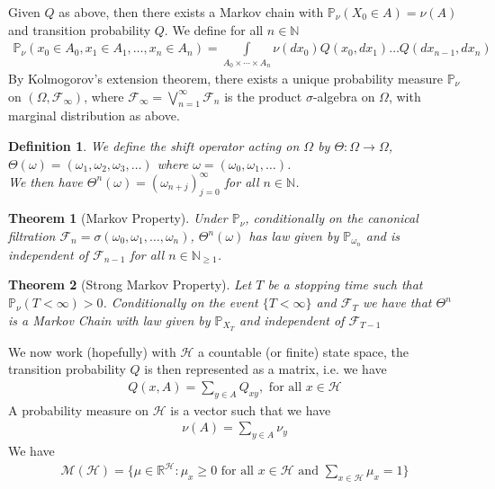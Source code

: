\documentclass[11pt,a4paper, final]{article}
\newtheorem{thm}{Theorem}[section]
\newtheorem{defn}{Definition}[section]
\theoremstyle{definition}
\begin{document}
\noindent Given $Q$ as above, then there exists a Markov chain with $\mathbb{P}_\nu ( X_0 \in A) = \nu (A)$ and transition probability $Q$. We define for all $n  \in \mathbb{N}$ 
\begin{align*}
\mathbb{P}_\nu ( x_0 \in A_0 , x_1 \in A_1, \dots , x_n \in A_n ) = \int \limits_{A_0 \times \cdots \times A_n} \nu (dx_0) Q(x_0,dx_1) \dots Q(dx_{n-1}, dx_n)
\end{align*}
By Kolmogorov's extension theorem, there exists a unique probability measure $\mathbb{P}_\nu$ on $( \Omega, \mathcal{F}_\infty)$, where $\mathcal{F}_\infty = \bigvee_{n=1}^\infty \mathcal{F}_n$ is the product $\sigma$-algebra on $\Omega$, with marginal distribution as above. 
\begin{defn} We define the shift operator acting on $\Omega$ by $\Theta :\Omega \to \Omega$, $\Theta(\omega)=( \omega_1, \omega_2, \omega_3, \dots )$ where $\omega=( \omega_0, \omega_1, \dots )$. \\ We then have $\Theta^n( \omega) = ( \omega_{n+j})_{j=0}^\infty$ for all $n \in \mathbb{N}$.
\end{defn}
\begin{thm}[Markov Property] Under $\mathbb{P}_\nu$, conditionally on the canonical filtration $\mathcal{F}_n= \sigma( \omega_0, \omega_1, \dots , \omega_n)$, $\Theta^n ( \omega)$ has law given by $\mathbb{P}_{\omega_n}$ and is independent of $\mathcal{F}_{n-1}$ for all $n \in \mathbb{N}_{ \geq 1}$. 
\end{thm}
\begin{thm}[Strong Markov Property] Let $T$ be a stopping time such that $\mathbb{P}_\nu (T < \infty) >0 $. Conditionally on the event $\lbrace T < \infty \rbrace$ and $\mathcal{F}_T$ we have that $\Theta^n$ is a Markov Chain with law given by $\mathbb{P}_{X_T}$ and independent of $\mathcal{F}_{T-1}$ 
\end{thm}
\newpage
We now work (hopefully) with $\mathcal{H}$ a countable (or finite) state space, the transition probability $Q$ is then represented as a matrix, i.e. we have 
\begin{align*}
Q(x,A) = \sum_{y \in A} Q_{xy}, \text{ for all } x \in \mathcal{H}
\end{align*}
A probability measure on $\mathcal{H}$ is a vector such that we have 
\begin{align*}
 \nu (A) = \sum_{y \in A} \nu_y 
\end{align*}
We have 
\begin{align*}
\mathcal{M}( \mathcal{H}) = \lbrace \mu \in \mathbb{R}^\mathcal{H} : \mu_x \geq 0 \text{ for all } x \in \mathcal{H} \text{ and } \sum_{x \in \mathcal{H}} \mu_x = 1 \rbrace 
\end{align*} 
\end{document}
